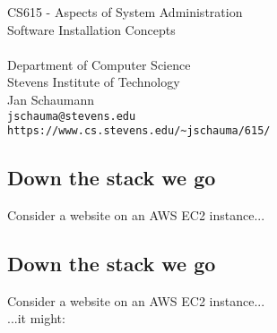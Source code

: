 \documentclass[xga]{xdvislides}
\begin{document}
\setfontphv

\lhead{\slidetitle}                               %
\cfoot{\relax}                               %
\rfoot{\Gray{\today}}

\vspace*{\fill}
\begin{center}
	\Hugesize
		CS615 - Aspects of System Administration\\ [1em]
		Software Installation Concepts \\ [1em]
	\hspace*{5mm}\blueline\\ [1em]
	\Normalsize
		Department of Computer Science\\
		Stevens Institute of Technology\\
		Jan Schaumann\\
		\verb+jschauma@stevens.edu+ \\
		\verb+https://www.cs.stevens.edu/~jschauma/615/+
\end{center}
\vspace*{\fill}


\subsection{Down the stack we go}
Consider a website on an AWS EC2 instance...

\subsection{Down the stack we go}
Consider a website on an AWS EC2 instance...
\\

...it might:
\end{document}
